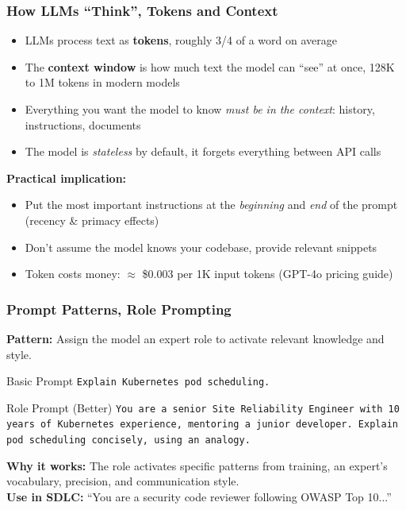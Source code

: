 \begin{frame}[fragile]\frametitle{How LLMs ``Think'', Tokens and Context}
\begin{itemize}
\item LLMs process text as \textbf{tokens}, roughly 3/4 of a word on average
\item The \textbf{context window} is how much text the model can ``see'' at once, 128K to 1M tokens in modern models
\item Everything you want the model to know \textit{must be in the context}: history, instructions, documents
\item The model is \textit{stateless} by default, it forgets everything between API calls
\end{itemize}

\textbf{Practical implication:}
\begin{itemize}
\item Put the most important instructions at the \textit{beginning} and \textit{end} of the prompt (recency \& primacy effects)
\item Don't assume the model knows your codebase, provide relevant snippets
\item Token costs money: $\approx$ \$0.003 per 1K input tokens (GPT-4o pricing guide)
\end{itemize}
\end{frame}

\begin{frame}[fragile]\frametitle{Prompt Patterns, Role Prompting}
\textbf{Pattern:} Assign the model an expert role to activate relevant knowledge and style.

\begin{block}{Basic Prompt}
\texttt{Explain Kubernetes pod scheduling.}
\end{block}

\begin{block}{Role Prompt (Better)}
\texttt{You are a senior Site Reliability Engineer with 10 years of Kubernetes experience, mentoring a junior developer. Explain pod scheduling concisely, using an analogy.}
\end{block}

\textbf{Why it works:} The role activates specific patterns from training, an expert's vocabulary, precision, and communication style.\\
\textbf{Use in SDLC:} ``You are a security code reviewer following OWASP Top 10...''
\end{frame}


